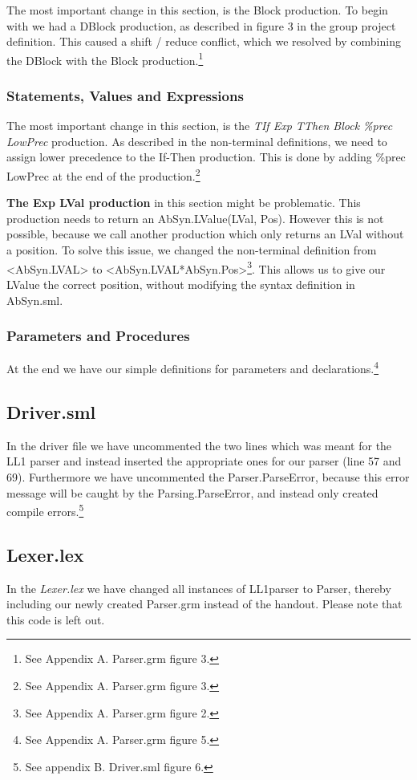 \documentclass[12pt,a4paper,english]{article}
\begin{document}
The most important change in this section, is the Block production. To begin with we had a DBlock production, as described in figure 3 in the group project definition. This caused a shift / reduce conflict, which we resolved by combining the DBlock with the Block production.\footnote{See Appendix A. Parser.grm figure 3.}

\subsubsection{Statements, Values and Expressions}
The most important change in this section, is the \textit{TIf Exp TThen Block \%prec LowPrec} production. As described in the non-terminal definitions, we need to assign lower precedence to the If-Then production. This is done by adding \%prec LowPrec at the end of the production.\footnote{See Appendix A. Parser.grm figure 3.}

\textbf{The Exp LVal production} in this section might be problematic. This production needs to return an AbSyn.LValue(LVal, Pos). However this is not possible, because we call another production which only returns an LVal without a position. To solve this issue, we changed the non-terminal definition from <AbSyn.LVAL> to <AbSyn.LVAL*AbSyn.Pos>\footnote{See Appendix A.  Parser.grm figure 2.}. This allows us to give our LValue the correct position, without modifying the syntax definition in AbSyn.sml.

\subsubsection{Parameters and Procedures}
At the end we have our simple definitions for parameters and declarations.\footnote{See Appendix A. Parser.grm figure 5.}

\subsection{Driver.sml}
In the driver file we have uncommented the two lines which was meant for the LL1 parser and instead inserted the appropriate ones for our parser (line 57 and 69). Furthermore we have uncommented the Parser.ParseError, because this error message will be caught by the Parsing.ParseError, and instead only created compile errors.\footnote{See appendix B. Driver.sml figure 6.}
\newpage
\subsection{Lexer.lex}
In the \textit{Lexer.lex} we have changed all instances of LL1parser to Parser, thereby including our newly created Parser.grm instead of the handout. Please note that this code is left out.
\end{document}
